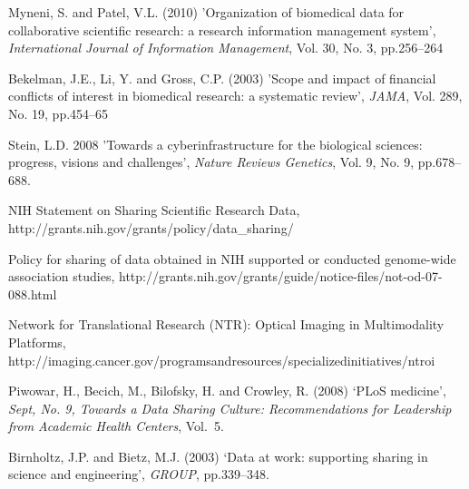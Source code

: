 \documentclass{singlecol-new}
\theoremstyle{TH}{
\newtheorem{lemma}{Lemma}
\newtheorem{theorem}[lemma]{Theorem}
\newtheorem{corrolary}[lemma]{Corrolary}
\newtheorem{conjecture}[lemma]{Conjecture}
\newtheorem{proposition}[lemma]{Proposition}
\newtheorem{claim}[lemma]{Claim}
\newtheorem{stheorem}[lemma]{Wrong Theorem}
\newtheorem{algorithm}{Algorithm}
}
\theoremstyle{THrm}{
\newtheorem{definition}{Definition}[section]
\newtheorem{question}{Question}[section]
\newtheorem{remark}{Remark}
\newtheorem{scheme}{Scheme}
}
\theoremstyle{THhit}{
\newtheorem{case}{Case}[section]
}
\begin{document}
\begin{thebibliography}{10}

Myneni, S. and  Patel, V.L. (2010) 'Organization of biomedical data
for collaborative scientific research: a research information
management system', {\it International Journal of Information
Management}, Vol. 30, No. 3, pp.256--264

Bekelman, J.E., Li, Y. and Gross, C.P. (2003) 'Scope and impact of
financial conflicts of interest in biomedical research: a systematic
review', {\it JAMA}, Vol. 289, No. 19, pp.454--65

Stein, L.D. {2008} 'Towards a cyberinfrastructure for the biological
sciences: progress, visions and challenges', {\it Nature Reviews
Genetics}, Vol. 9, No. 9, pp.678--688.

NIH Statement on Sharing Scientific Research Data,
http://grants.nih.gov/grants/policy/data\_sharing/

 Policy for
sharing of data obtained in NIH supported or conducted genome-wide
association studies,
http://grants.nih.gov/grants/guide/notice-files/not-od-07-088.html

 Network for Translational Research
(NTR): Optical Imaging in Multimodality Platforms,
http://imaging.cancer.gov/programsandresources/specializedinitiatives/ntroi

Piwowar, H., Becich, M., Bilofsky, H. and Crowley, R. (2008) `PLoS
medicine', {\it Sept, No. 9, Towards a Data Sharing Culture:
Recommendations for Leadership from Academic Health Centers},
Vol.~5.

Birnholtz, J.P. and Bietz, M.J. (2003) `Data at work: supporting
sharing in science and engineering', {\it GROUP}, pp.339--348.


\end{thebibliography}
\end{document}
